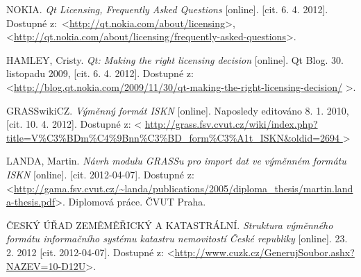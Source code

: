 \documentclass[a4paper,10pt]{article}
\begin{document}
\begin{thebibliography}{9}

NOKIA. \textit{Qt Licensing, Frequently Asked Questions} [online]. [cit. 6. 4. 2012].
Dostupné z:~\textless\url{http://qt.nokia.com/about/licensing}\textgreater, \textless\url{http://qt.nokia.com/about/licensing/frequently-asked-questions}\textgreater.

HAMLEY, Cristy. \textit{Qt: Making the right licensing decision} [online]. Qt Blog. 30. listopadu 2009, [cit. 6. 4. 2012]. Dostupné z: \textless\url{http://blog.qt.nokia.com/2009/11/30/qt-making-the-right-licensing-decision/} \textgreater.

GRASSwikiCZ. \textit{Výměnný formát ISKN} [online].
Naposledy editováno 8. 1. 2010, [cit. 10. 4. 2012]. Dostupné z: \textless
\url{
    http://grass.fsv.cvut.cz/wiki/index.php?title=V%
    } \textgreater

LANDA, Martin. \emph{Návrh modulu GRASSu pro import dat ve výměnném formátu ISKN} [online]. [cit. 2012-04-07]. Dostupné z: \textless\url{http://gama.fsv.cvut.cz/~landa/publications/2005/diploma_thesis/martin.landa-thesis.pdf}\textgreater. Diplomová práce. ČVUT Praha.

ČESKÝ ÚŘAD ZEMĚMĚŘICKÝ A KATASTRÁLNÍ. \emph{Struktura výměnného formátu informačního systému katastru nemovitostí České republiky} [online]. 23. 2. 2012 [cit. 2012-04-07]. Dostupné z: \textless\url{http://www.cuzk.cz/GenerujSoubor.ashx?NAZEV=10-D12U}\textgreater.
    
    \end{thebibliography}
\end{document}
